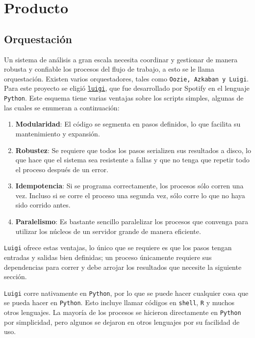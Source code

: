 \chapter{Producto}
\label{producto}


\section{Orquestación}

Un sistema de análisis a gran escala necesita coordinar y gestionar de manera robusta y confiable los procesos del flujo de trabajo, a esto se le llama orquestación. Existen varios orquestadores, tales como \texttt{Oozie, Azkaban y Luigi}. Para este proyecto se eligió  \href{http://luigi.readthedocs.org/en/stable/}{\texttt{luigi}}, que fue desarrollado por Spotify en el lenguaje \texttt{Python}. Este esquema tiene varias ventajas sobre los scripts simples, algunas de las cuales se enumeran a continuación:

\begin{enumerate}
\item \textbf{Modularidad}: El código se segmenta en pasos definidos, lo que facilita su mantenimiento y expansión.
\item \textbf{Robustez}: Se requiere que todos los pasos serializen sus resultados a disco, lo que hace que el sistema sea resistente a fallas y que no tenga que repetir todo el proceso después de un error.
\item \textbf{Idempotencia}: Si se programa correctamente, los procesos sólo corren una vez. Incluso si se corre el proceso una segunda vez, sólo corre lo que no haya sido corrido antes.
\item \textbf{Paralelismo}: Es bastante sencillo paralelizar los procesos que convenga para utilizar los núcleos de un servidor grande de manera eficiente.
\end{enumerate}



 \texttt{Luigi} ofrece estas ventajas, lo único que se requiere es que los pasos tengan entradas y salidas bien definidas; un proceso únicamente requiere sus dependencias para correr y debe arrojar los resultados que necesite la siguiente sección.

\texttt{Luigi} corre nativamente en \texttt{Python}, por lo que se puede hacer cualquier cosa que se pueda hacer en \texttt{Python}. Esto incluye llamar códigos en \texttt{shell}, \texttt{R} y muchos otros lenguajes. La mayoría de los procesos se hicieron directamente en \texttt{Python} por simplicidad, pero algunos se dejaron en otros lenguajes por su facilidad de uso.

